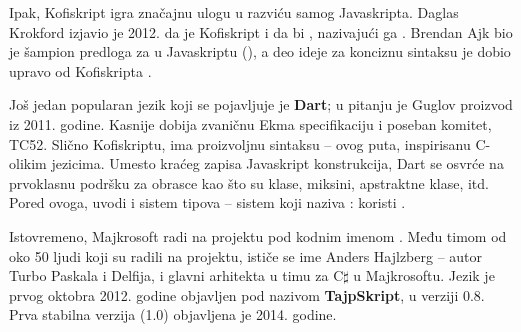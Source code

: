 Ipak, Kofiskript igra značajnu ulogu u razviću samog Javaskripta.
Daglas Krokford izjavio je 2012. da je Kofiskript  i da bi , nazivajući ga  \cite{crockford:java-was-failure}.
Brendan Ajk bio je šampion predloga za  u Javaskriptu (\code{=>}), a deo ideje za konciznu sintaksu je dobio upravo od Kofiskripta \cite{hn:brendan-eich-dart-coffee-es6}.

Još jedan popularan jezik koji se pojavljuje je \textbf{Dart}; u pitanju je Guglov proizvod iz 2011. godine.
Kasnije dobija zvaničnu Ekma specifikaciju i poseban komitet, TC52.
Slično Kofiskriptu, ima proizvoljnu sintaksu -- ovog puta, inspirisanu C-olikim jezicima.
Umesto kraćeg zapisa Javaskript konstrukcija, Dart se osvrće na prvoklasnu podršku za obrasce kao što su klase, miksini, apstraktne klase, itd.
Pored ovoga, uvodi i sistem tipova -- sistem koji naziva : koristi  \cite{dart}.

Istovremeno, Majkrosoft radi na projektu pod kodnim imenom .
Među timom od oko 50 ljudi koji su radili na projektu, ističe se ime Anders Hajlzberg -- autor Turbo Paskala i Delfija, i glavni arhitekta u timu za C$\sharp$ u Majkrosoftu.
Jezik je prvog oktobra 2012. godine objavljen pod nazivom \textbf{TajpSkript}, u verziji 0.8.
Prva stabilna verzija (1.0) objavljena je 2014. godine.
